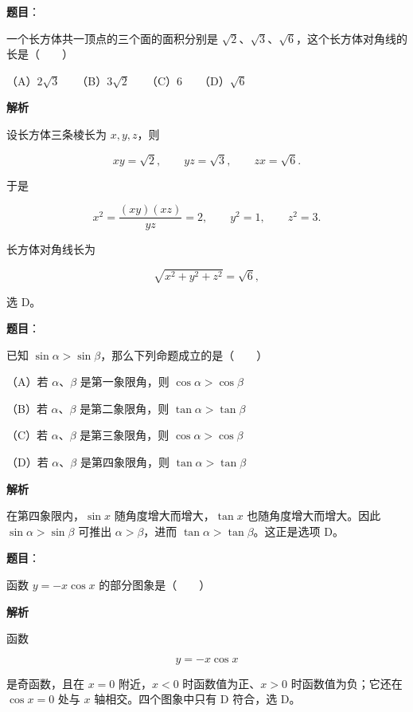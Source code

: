 \begin{answer}

\textbf{题目}：

一个长方体共一顶点的三个面的面积分别是 $\sqrt2$、$\sqrt3$、$\sqrt6$，这个长方体对角线的长是\mbox{（　　）}

（A）$2\sqrt3$　　（B）$3\sqrt2$　　（C）6　　（D）$\sqrt6$

\textbf{解析}

设长方体三条棱长为 $x,y,z$，则

\nopagebreak[4]
\[
xy=\sqrt2,\qquad yz=\sqrt3,\qquad zx=\sqrt6.
\]

于是

\nopagebreak[4]
\[
x^2=\frac{(xy)(xz)}{yz}=2,\qquad y^2=1,\qquad z^2=3.
\]

长方体对角线长为

\nopagebreak[4]
\[
\sqrt{x^2+y^2+z^2}=\sqrt6,
\]

选 D。


\end{answer}
\begin{answer}

\textbf{题目}：

已知 $\sin\alpha>\sin\beta$，那么下列命题成立的是\mbox{（　　）}

（A）若 $\alpha$、$\beta$ 是第一象限角，则 $\cos\alpha>\cos\beta$

（B）若 $\alpha$、$\beta$ 是第二象限角，则 $\tan\alpha>\tan\beta$

（C）若 $\alpha$、$\beta$ 是第三象限角，则 $\cos\alpha>\cos\beta$

（D）若 $\alpha$、$\beta$ 是第四象限角，则 $\tan\alpha>\tan\beta$

\textbf{解析}

在第四象限内，$\sin x$ 随角度增大而增大，$\tan x$ 也随角度增大而增大。因此 $\sin\alpha>\sin\beta$ 可推出 $\alpha>\beta$，进而 $\tan\alpha>\tan\beta$。这正是选项 D。


\end{answer}
\begin{answer}

\textbf{题目}：

函数 $y=-x\cos x$ 的部分图象是\mbox{（　　）}
\nopagebreak[4]
\begin{center}\end{center}
\nopagebreak[4]
\textbf{解析}

函数

\nopagebreak[4]
\[
y=-x\cos x
\]

是奇函数，且在 $x=0$ 附近，$x<0$ 时函数值为正、$x>0$ 时函数值为负；它还在 $\cos x=0$ 处与 $x$ 轴相交。四个图象中只有 D 符合，选 D。


\end{answer}
